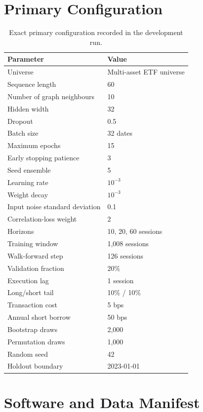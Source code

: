 \documentclass[10pt]{article}
\begin{document}
\section{Primary Configuration}

\begin{table}[tbp]
\centering
\caption{Exact primary configuration recorded in the development run.}
\begin{tabular}{ll}
\toprule
Parameter & Value\\
\midrule
Universe & Multi-asset ETF universe\\
Sequence length & 60\\
Number of graph neighbours & 10\\
Hidden width & 32\\
Dropout & 0.5\\
Batch size & 32 dates\\
Maximum epochs & 15\\
Early stopping patience & 3\\
Seed ensemble & 5\\
Learning rate & $10^{-3}$\\
Weight decay & $10^{-3}$\\
Input noise standard deviation & 0.1\\
Correlation-loss weight & 2\\
Horizons & 10, 20, 60 sessions\\
Training window & 1,008 sessions\\
Walk-forward step & 126 sessions\\
Validation fraction & 20\%\\
Execution lag & 1 session\\
Long/short tail & 10\% / 10\%\\
Transaction cost & 5 bps\\
Annual short borrow & 50 bps\\
Bootstrap draws & 2,000\\
Permutation draws & 1,000\\
Random seed & 42\\
Holdout boundary & 2023-01-01\\
\bottomrule
\end{tabular}
\end{table}

\section{Software and Data Manifest}
\end{document}
